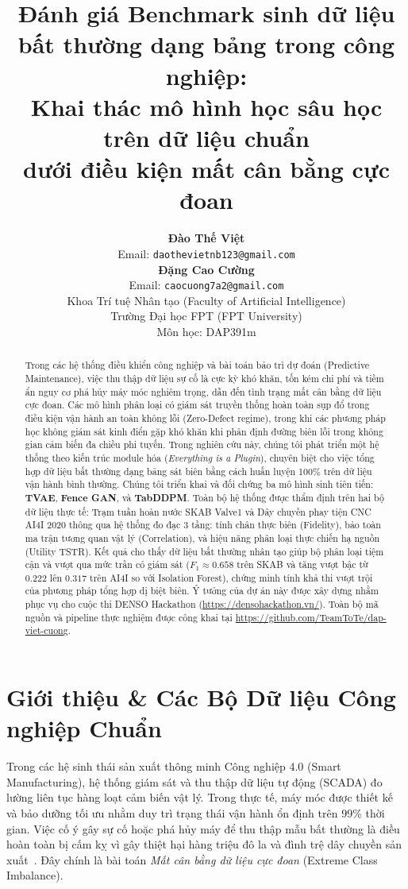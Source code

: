 \documentclass{article}
\title{Đánh giá Benchmark sinh dữ liệu bất thường dạng bảng trong công nghiệp:\\Khai thác mô hình học sâu học trên dữ liệu chuẩn\\dưới điều kiện mất cân bằng cực đoan}
\author{%
  \textbf{Đào Thế Việt} \\
  Email: \texttt{daothevietnb123@gmail.com} \\
  \And
  \textbf{Đặng Cao Cường} \\
  Email: \texttt{caocuong7a2@gmail.com} \\
  \AND
  \normalfont
  Khoa Trí tuệ Nhân tạo (Faculty of Artificial Intelligence) \\
  Trường Đại học FPT (FPT University) \\
  Môn học: DAP391m \\
}
\begin{document}
\maketitle

\begin{abstract}
Trong các hệ thống điều khiển công nghiệp và bài toán bảo trì dự đoán (Predictive Maintenance), việc thu thập dữ liệu sự cố là cực kỳ khó khăn, tốn kém chi phí và tiềm ẩn nguy cơ phá hủy máy móc nghiêm trọng, dẫn đến tình trạng mất cân bằng dữ liệu cực đoan. Các mô hình phân loại có giám sát truyền thống hoàn toàn sụp đổ trong điều kiện vận hành an toàn không lỗi (Zero-Defect regime), trong khi các phương pháp học không giám sát kinh điển gặp khó khăn khi phân định đường biên lỗi trong không gian cảm biến đa chiều phi tuyến. Trong nghiên cứu này, chúng tôi phát triển một hệ thống theo kiến trúc module hóa (\emph{Everything is a Plugin}), chuyên biệt cho việc tổng hợp dữ liệu bất thường dạng bảng sát biên bằng cách huấn luyện 100\% trên dữ liệu vận hành bình thường. Chúng tôi triển khai và đối chứng ba mô hình sinh tiên tiến: \textbf{TVAE}, \textbf{Fence GAN}, và \textbf{TabDDPM}. Toàn bộ hệ thống được thẩm định trên hai bộ dữ liệu thực tế: Trạm tuần hoàn nước SKAB Valve1 và Dây chuyền phay tiện CNC AI4I 2020 thông qua hệ thống đo đạc 3 tầng: tính chân thực biên (Fidelity), bảo toàn ma trận tương quan vật lý (Correlation), và hiệu năng phân loại thực chiến hạ nguồn (Utility TSTR). Kết quả cho thấy dữ liệu bất thường nhân tạo giúp bộ phân loại tiệm cận và vượt qua mức trần có giám sát ($F_1 \approx 0.658$ trên SKAB và tăng vượt bậc từ $0.222$ lên $0.317$ trên AI4I so với Isolation Forest), chứng minh tính khả thi vượt trội của phương pháp tổng hợp dị biệt biên. Ý tưởng của dự án này được xây dựng nhằm phục vụ cho cuộc thi DENSO Hackathon (\url{https://densohackathon.vn/}). Toàn bộ mã nguồn và pipeline thực nghiệm được công khai tại \url{https://github.com/TeamToTe/dap-viet-cuong}.
\end{abstract}

\section{Giới thiệu \& Các Bộ Dữ liệu Công nghiệp Chuẩn}
\label{sec:intro_data}

Trong các hệ sinh thái sản xuất thông minh Công nghiệp 4.0 (Smart Manufacturing), hệ thống giám sát và thu thập dữ liệu tự động (SCADA) đo lường liên tục hàng loạt cảm biến vật lý. Trong thực tế, máy móc được thiết kế và bảo dưỡng tối ưu nhằm duy trì trạng thái vận hành ổn định trên 99\% thời gian. Việc cố ý gây sự cố hoặc phá hủy máy để thu thập mẫu bất thường là điều hoàn toàn bị cấm kỵ vì gây thiệt hại hàng triệu đô la và đình trệ dây chuyền sản xuất~\citep{katser2021skab, matzka2020explainable}. Đây chính là bài toán \emph{Mất cân bằng dữ liệu cực đoan} (Extreme Class Imbalance).
\end{document}
